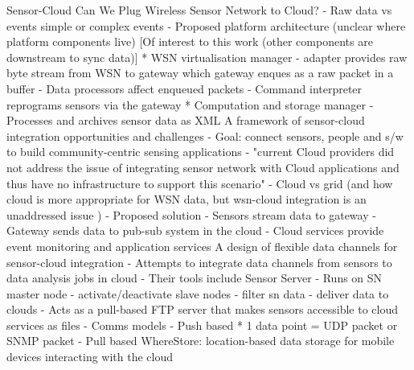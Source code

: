 		Sensor-Cloud
			Can We Plug Wireless Sensor Network to Cloud?
				- Raw data vs events
					simple or complex events
				- Proposed platform architecture (unclear where platform components live)
					[Of interest to this work (other components are downstream to sync data)]
					* WSN virtualisation manager
						- adapter provides raw byte stream from WSN to gateway which gateway enques as a raw packet in a buffer
						- Data processors affect enqueued packets
						- Command interpreter reprograms sensors via the gateway
					* Computation and storage manager
						- Processes and archives sensor data as XML
			A framework of sensor-cloud integration opportunities and challenges
				- Goal: connect sensors, people and s/w to build community-centric sensing applications
				- "current Cloud providers did not address the issue of integrating sensor network with Cloud applications and thus have no infrastructure to support this scenario"
				- Cloud vs grid (and how cloud is more appropriate for WSN data, but wsn-cloud integration is an unaddressed issue )
				- Proposed solution
					- Sensors stream data to gateway
					- Gateway sends data to pub-sub system in the cloud
					- Cloud services provide event monitoring and application services
			A design of flexible data channels for sensor-cloud integration
				- Attempts to integrate data channels from sensors to data analysis jobs in cloud
				- Their tools include Sensor Server
					- Runs on SN master node
					- activate/deactivate slave nodes
					- filter sn data
					- deliver data to clouds
					- Acts as a pull-based FTP server that makes sensors accessible to cloud services as files
				- Comms models
					- Push based
						* 1 data point = UDP packet or SNMP packet
					- Pull based				
			WhereStore: location-based data storage for mobile devices interacting with the cloud
